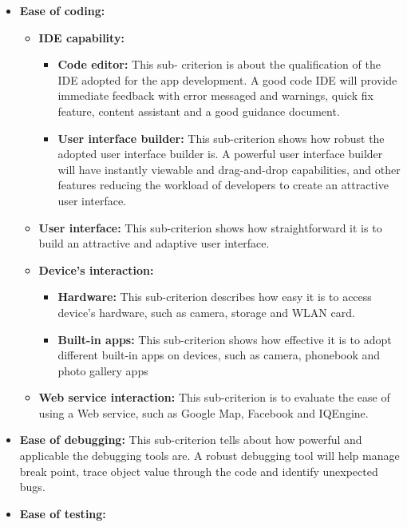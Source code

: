 \begin{itemize}
\begin{itemize}
                        \item\textbf{Ease of coding:}
                        \begin{itemize}
                        \item\textbf{IDE capability:}
                        \begin{itemize}
                            \item\textbf{Code editor:} This sub- criterion is about the qualification of the IDE adopted for the app development. A good code IDE will provide immediate feedback with error messaged and warnings, quick fix feature, content assistant and a good guidance document.
                            \item\textbf{User interface builder:} This sub-criterion shows how robust the adopted user interface builder is. A powerful user interface builder will have instantly viewable and drag-and-drop capabilities, and other features reducing the workload of developers to create an attractive user interface.
                        \end{itemize}
                        
                            \item\textbf{User interface:} This sub-criterion shows how straightforward it is to build an attractive and adaptive user interface.
                            \item\textbf{Device’s interaction:}
                            \begin{itemize}
                                \item\textbf{Hardware:} This sub-criterion describes how easy it is to access device’s hardware, such as camera, storage and WLAN card.
                                \item\textbf{Built-in apps:} This sub-criterion shows how effective it is to adopt different built-in apps on devices, such as camera, phonebook and photo gallery apps
                            \end{itemize}
                            
                            \item\textbf{Web service interaction:} This sub-criterion is to evaluate the ease of using a Web service, such as Google Map, Facebook and IQEngine.
                        \end{itemize}
                        
                        \item\textbf{Ease of debugging:} This sub-criterion tells about how powerful and applicable the debugging tools are. A robust debugging tool will help manage break point, trace object value through the code and identify unexpected bugs.
                        \item\textbf{Ease of testing:}
                        

\end{itemize}
\end{itemize}
